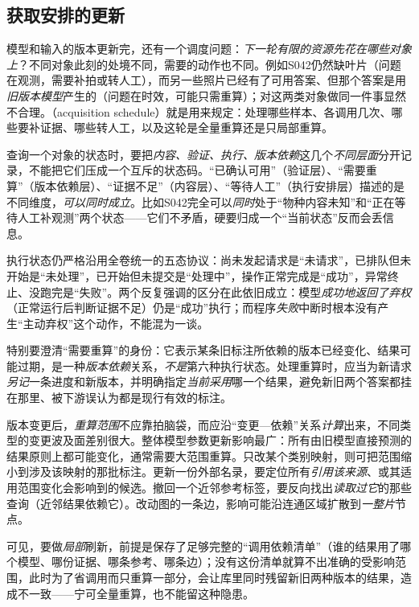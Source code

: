 \subsection{获取安排的更新}
\label{sec:knowledge-acquisition-schedule-update}

模型和输入的版本更新完，还有一个调度问题：\emph{下一轮有限的资源先花在哪些对象上}？不同对象此刻的处境不同，需要的动作也不同。例如S042仍然缺叶片（问题在观测，需要补拍或转人工），而另一些照片已经有了可用答案、但那个答案是用\emph{旧版本模型}产生的（问题在时效，可能只需重算）；对这两类对象做同一件事显然不合理。（acquisition schedule）就是用来规定：处理哪些样本、各调用几次、哪些要补证据、哪些转人工，以及这轮是全量重算还是只局部重算。

查询一个对象的状态时，要把\emph{内容、验证、执行、版本依赖}这几个\emph{不同层面}分开记录，不能把它们压成一个互斥的状态码。“已确认可用”（验证层）、“需要重算”（版本依赖层）、“证据不足”（内容层）、“等待人工”（执行安排层）描述的是不同维度，\emph{可以同时成立}。比如S042完全可以\emph{同时}处于“物种内容未知”和“正在等待人工补观测”两个状态——它们不矛盾，硬要归成一个“当前状态”反而会丢信息。

执行状态仍严格沿用全卷统一的五态协议：尚未发起请求是“未请求”，已排队但未开始是“未处理”，已开始但未提交是“处理中”，操作正常完成是“成功”，异常终止、没跑完是“失败”。两个反复强调的区分在此依旧成立：模型\emph{成功地返回了弃权}（正常运行后判断证据不足）仍是“成功”执行；而程序\emph{失败}中断时根本没有产生“主动弃权”这个动作，不能混为一谈。

特别要澄清“需要重算”的身份：它表示某条旧标注所依赖的版本已经变化、结果可能过期，是一种\emph{版本依赖}关系，\emph{不是}第六种执行状态。处理重算时，应当为新请求\emph{另记}一条进度和新版本，并明确指定\emph{当前采用}哪一个结果，避免新旧两个答案都挂在那里、被下游误认为都是现行有效的标注。

版本变更后，\emph{重算范围}不应靠拍脑袋，而应沿“变更—依赖”关系\emph{计算}出来，不同类型的变更波及面差别很大。整体模型参数更新影响最广：所有由旧模型直接预测的结果原则上都可能变化，通常需要大范围重算。只改某个类别映射，则可把范围缩小到涉及该映射的那批标注。更新一份外部名录，要定位所有\emph{引用该来源}、或其适用范围变化会影响到的候选。撤回一个近邻参考标签，要反向找出\emph{读取过它}的那些查询（近邻结果依赖它）。改动图的一条边，影响可能沿连通区域扩散到\emph{一整片}节点。

可见，要做\emph{局部}刷新，前提是保存了足够完整的“调用依赖清单”（谁的结果用了哪个模型、哪份证据、哪条参考、哪条边）；没有这份清单就算不出准确的受影响范围，此时为了省调用而只重算一部分，会让库里同时残留新旧两种版本的结果，造成不一致——宁可全量重算，也不能留这种隐患。

